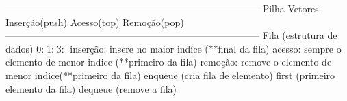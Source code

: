 --------------------------------------------------------------------------------
Pilha Vetores 
{
Inserção(push)
Acesso(top)
Remoção(pop)
}
--------------------------------------------------------------------------------
Fila (estrutura de dados)
0:🧑1:🧑3:🧑
 {
  inserção: insere no maior indíce (**final da fila)
  acesso: sempre o elemento de menor indice (**primeiro da fila)
  remoção: remove o elemento de menor indice(**primeiro da fila)
 }
 enqueue (cria fila de elemento)
 first (primeiro elemento da fila)
 dequeue (remove a fila)